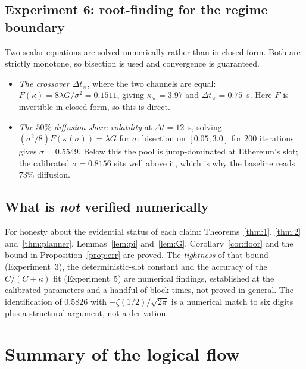 \documentclass[11pt]{article}
\theoremstyle{definition}
\theoremstyle{remark}
\newcommand{\dt}{\Delta t}
\newcommand{\1}{\mathbf{1}}
\begin{document}
\subsection{Experiment 6: root-finding for the regime boundary}

Two scalar equations are solved numerically rather than in closed form. Both are strictly monotone, so bisection is used and convergence is guaranteed.
\begin{itemize}[leftmargin=2em]
\item \emph{The crossover $\dt_\times$}, where the two channels are equal: $F(\kappa) = 8\lambda G/\sigma^2 = 0.1511$, giving $\kappa_\times = 3.97$ and $\dt_\times = 0.75$~s. Here $F$ is invertible in closed form, so this is direct.
\item \emph{The $50\%$ diffusion-share volatility} at $\dt = 12$~s, solving $(\sigma^2/8)F(\kappa(\sigma)) = \lambda G$ for $\sigma$: bisection on $[0.05, 3.0]$ for $200$ iterations gives $\sigma = 0.5549$. Below this the pool is jump-dominated at Ethereum's slot; the calibrated $\sigma = 0.8156$ sits well above it, which is why the baseline reads $73\%$ diffusion.
\end{itemize}

\subsection{What is \emph{not} verified numerically}

For honesty about the evidential status of each claim: Theorems~\ref{thm:1}, \ref{thm:2} and~\ref{thm:planner}, Lemmas~\ref{lem:pi} and~\ref{lem:G}, Corollary~\ref{cor:floor} and the bound in Proposition~\ref{prop:err} are proved. The \emph{tightness} of that bound (Experiment~3), the deterministic-slot constant and the accuracy of the $C/(C+\kappa)$ fit (Experiment~5) are numerical findings, established at the calibrated parameters and a handful of block times, not proved in general. The identification of $0.5826$ with $-\zeta(1/2)/\sqrt{2\pi}$ is a numerical match to six digits plus a structural argument, not a derivation.

\section{Summary of the logical flow}
\end{document}
